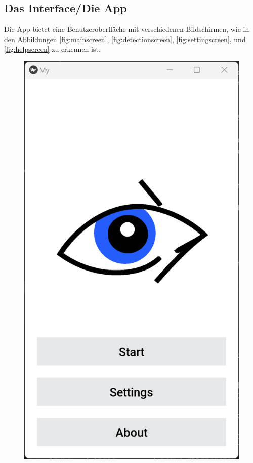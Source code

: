 \subsection{Das Interface/Die App}
\label{ssec:interface}

Die App bietet eine Benutzeroberfläche mit verschiedenen Bildschirmen, wie in den Abbildungen \ref{fig:mainscreen}, \ref{fig:detectionscreen}, \ref{fig:settingscreen}, und \ref{fig:helpscreen} zu erkennen ist.

\begin{figure}[h]
	\centering
	\begin{minipage}[b]{0.22\textwidth}
		\includegraphics[width=\linewidth]{images/mainscreen.png}

\end{minipage}
\end{figure}
